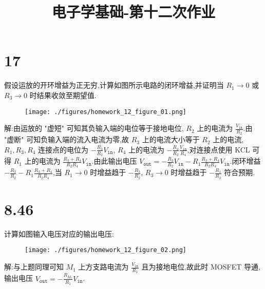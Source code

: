 
\usepackage{../../homeworks_preamble}
\title{电子学基础-第十二次作业}


    \maketitle
    \section{17} 假设运放的开环增益为正无穷,计算如图所示电路的闭环增益,并证明当 $R_1\rightarrow 0$ 或 $R_3\rightarrow 0$ 时结果收敛至期望值.
    \begin{figure}[htbp]
        \centering
        \texttt{[image: ./figures/homework\_12\_figure\_01.png]}
    \end{figure}
    
    解:由运放的 "虚短" 可知其负输入端的电位等于接地电位, $R_2$ 上的电流为 $\frac{V_{\texttt{in}}}{R_2}$.由 "虚断" 可知负输入端的流入电流为零,故 $R_3$ 上的电流大小等于 $R_2$ 上的电流, $R_1,R_3,R_4$ 连接点的电位为 $-\frac{R_3}{R_2}V_{\texttt{in}}$, $R_4$ 上的电流为 $-\frac{R_3}{R_2}\frac{V_{\texttt{in}}}{R_4}$,对连接点使用 KCL 可得 $R_1$ 上的电流为 $\frac{R_3+R_4}{R_2R_4}V_{\texttt{in}}$.由此输出电压 $V_{\texttt{out}}=-\frac{R_3}{R_2}V_{\texttt{in}}-R_1 \frac{R_3+R_4}{R_2R_4}V_{\texttt{in}}$.闭环增益 $-\frac{R_3}{R_2}-R_1 \frac{R_3+R_4}{R_2R_4}$,当 $R_1\rightarrow 0$ 时增益趋于 $-\frac{R_3}{R_2}$, $R_3\rightarrow 0$ 时增益趋于 $-\frac{R_1}{R_2}$ 符合预期.

    \section{8.46} 计算如图输入电压对应的输出电压:
    \begin{figure}[htbp]
        \centering
        \texttt{[image: ./figures/homework\_12\_figure\_02.png]}
    \end{figure}
    
    解:与上题同理可知 $M_1$ 上方支路电流为 $\frac{V_{\texttt{in}}}{R_1}$ 且为接地电位,故此时 MOSFET 导通,输出电压 $V_{\texttt{out}}=-\frac{R_{M_1}}{R_1}V_{\texttt{in}}$.

